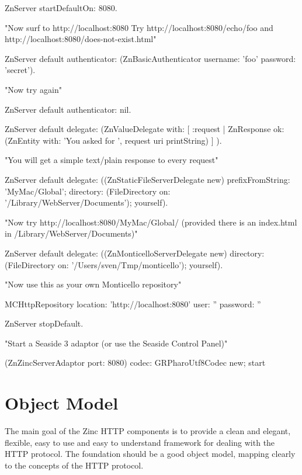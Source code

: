 \documentclass[a4paper,10pt,twoside]{book}
\begin{document}
\begin{code}{}
ZnServer startDefaultOn: 8080. 


"Now surf to http://localhost:8080
 Try http://localhost:8080/echo/foo and http://localhost:8080/does-not-exist.html"


ZnServer default authenticator: (ZnBasicAuthenticator username: 'foo' password: 'secret').


"Now try again"


ZnServer default authenticator: nil.

ZnServer default delegate: 
  (ZnValueDelegate with: [ :request | 
    ZnResponse ok: (ZnEntity with: 'You asked for ', request uri printString) ] ).


"You will get a simple text/plain response to every request"


ZnServer default delegate: ((ZnStaticFileServerDelegate new) 
                               prefixFromString: 'MyMac/Global'; 
                               directory: (FileDirectory on: '/Library/WebServer/Documents'); 
                               yourself).


"Now try http://localhost:8080/MyMac/Global/ 
 (provided there is an index.html in /Library/WebServer/Documents)"


ZnServer default delegate: ((ZnMonticelloServerDelegate new) 
                               directory: (FileDirectory on: '/Users/sven/Tmp/monticello'); 
                               yourself).


"Now use this as your own Monticello repository"


MCHttpRepository
  location: 'http://localhost:8080'
  user: ''
  password: ''

ZnServer stopDefault.


"Start a Seaside 3 adaptor (or use the Seaside Control Panel)"


(ZnZincServerAdaptor port: 8080)
  codec: GRPharoUtf8Codec new;
  start
\end{code}  
  
\section{Object Model}

The main goal of the Zinc HTTP components is to provide a clean and elegant, flexible, easy to use and easy to understand framework for dealing with the HTTP protocol. The foundation should be a good object model, mapping clearly to the concepts of the HTTP protocol.
\end{document}
